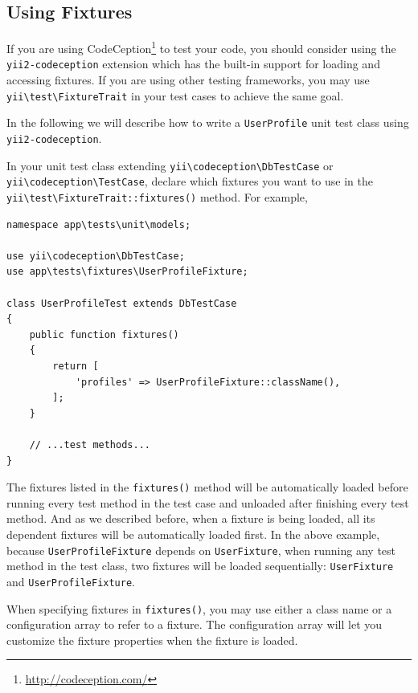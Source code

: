 \subsection{Using Fixtures}
If you are using CodeCeption\footnote{\url{http://codeception.com/}} to test your code, you should consider using
the \lstinline|yii2-codeception| extension which has the built-in support for loading and accessing fixtures.
If you are using other testing frameworks, you may use \texttt{yii{\allowbreak{}\textbackslash}test{\allowbreak{}\textbackslash}FixtureTrait} in your test cases
to achieve the same goal.

In the following we will describe how to write a \lstinline|UserProfile| unit test class using \lstinline|yii2-codeception|.

In your unit test class extending \texttt{yii{\allowbreak{}\textbackslash}codeception{\allowbreak{}\textbackslash}DbTestCase} or \texttt{yii{\allowbreak{}\textbackslash}codeception{\allowbreak{}\textbackslash}TestCase},
declare which fixtures you want to use in the \texttt{yii{\allowbreak{}\textbackslash}test{\allowbreak{}\textbackslash}FixtureTrait\allowbreak{}::\allowbreak{}fixtures()} method. For example,

\lstset{language=php}\begin{lstlisting}
namespace app\tests\unit\models;

use yii\codeception\DbTestCase;
use app\tests\fixtures\UserProfileFixture;

class UserProfileTest extends DbTestCase
{
    public function fixtures()
    {
        return [
            'profiles' => UserProfileFixture::className(),
        ];
    }

    // ...test methods...
}
\end{lstlisting}
The fixtures listed in the \lstinline|fixtures()| method will be automatically loaded before running every test method
in the test case and unloaded after finishing every test method. And as we described before, when a fixture is
being loaded, all its dependent fixtures will be automatically loaded first. In the above example, because
\lstinline|UserProfileFixture| depends on \lstinline|UserFixture|, when running any test method in the test class,
two fixtures will be loaded sequentially: \lstinline|UserFixture| and \lstinline|UserProfileFixture|.

When specifying fixtures in \lstinline|fixtures()|, you may use either a class name or a configuration array to refer to
a fixture. The configuration array will let you customize the fixture properties when the fixture is loaded.

